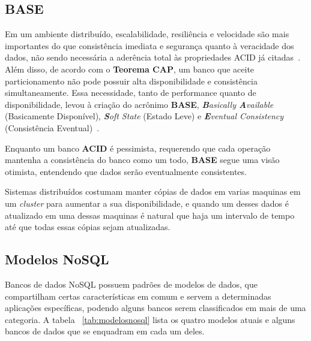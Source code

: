 
\subsection{BASE}
    Em um ambiente distribuído, escalabilidade, resiliência e velocidade são mais importantes do que consistência imediata e segurança quanto à veracidade dos  dados, não sendo necessária a aderência total às propriedades ACID já citadas~\cite{neo4j_acidbase}. Além disso, de acordo com o \textbf{Teorema CAP}, um banco que aceite particionamento não pode possuir alta disponibilidade e consistência simultaneamente. Essa necessidade, tanto de performance quanto de disponibilidade, levou à criação do acrônimo \textbf{BASE}, \emph{\textbf{B}asically \textbf{A}vailable} (Basicamente Disponível), \emph{\textbf{S}oft State} (Estado Leve) e \emph{\textbf{E}ventual Consistency} (Consistência Eventual)~\cite{foxcluster}. 
    
    Enquanto um banco \textbf{ACID} é pessimista, requerendo que cada operação mantenha a consistência do banco como um todo, \textbf{BASE} segue uma visão otimista, entendendo que dados serão eventualmente consistentes.
    
    Sistemas distribuídos costumam manter cópias de dados em varias maquinas em um \emph{cluster} para aumentar a sua disponibilidade, e quando um desses dados é atualizado em uma dessas maquinas é natural que haja um intervalo de tempo até que todas essas cópias sejam atualizadas.

\subsection{Modelos NoSQL}
Bancos de dados NoSQL possuem padrões de modelos de dados, que compartilham certas características em comum e servem a determinadas aplicações específicas, podendo alguns bancos serem classificados em mais de uma categoria. A tabela ~\ref{tab:modelosnosql} lista os quatro modelos atuais e alguns bancos de dados que se enquadram em cada um deles.

